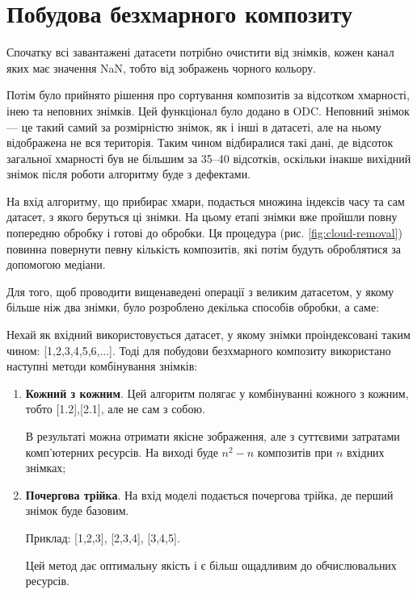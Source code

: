 \section{Побудова безхмарного композиту}

Спочатку всі завантажені датасети потрібно очистити від знімків, кожен канал
яких має значення NaN, тобто від зображень чорного кольору.

Потім було прийнято рішення про сортування композитів за відсотком хмарності, інею
та неповних знімків. Цей функціонал було додано в ODC. Неповний знімок --- це
такий самий за розмірністю знімок, як і інші в датасеті, але на ньому відображена не вся
територія. Таким чином відбиралися такі дані, де відсоток загальної хмарності був
не більшим за 35--40 відсотків, оскільки інакше вихідний знімок після роботи алгоритму
буде з дефектами.

На вхід алгоритму, що прибирає хмари, подається множина індексів часу та сам
датасет, з якого беруться ці знімки. На цьому етапі знімки вже пройшли повну попередню обробку і готові
до обробки. Ця процедура (рис. \ref{fig:cloud-removal}) повинна повернути певну
кількість композитів, які потім будуть оброблятися за допомогою медіани.

Для того, щоб проводити вищенаведені операції з великим датасетом, у якому більше
ніж два знімки, було розроблено декілька способів обробки, а саме:

Нехай як вхідний використовується датасет, у якому знімки проіндексовані таким
чином: [1,2,3,4,5,6,...]. Тоді для побудови безхмарного композиту використано
наступні методи комбінування знімків:

\begin{enumerate}
	\item \textbf{Кожний з кожним}. Цей алгоритм полягає у комбінуванні кожного з
		кожним, тобто [1.2],[2.1], але не сам з собою.

		В результаті можна отримати якісне зображення, але з суттєвими затратами комп’ютерних
		ресурсів. На виході буде $n^2 - n$ композитів при $n$ вхідних знімках;

	\item \textbf{Почергова трійка}. На вхід моделі подається почергова трійка, де перший
		знімок буде базовим.

		Приклад: [1,2,3], [2,3,4], [3,4,5].

		Цей метод дає оптимальну якість і є більш ощадливим до обчислювальних
		ресурсів.
\end{enumerate}


